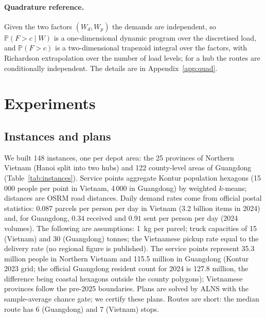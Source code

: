 \documentclass[ijoc,sglanonrev]{informs4}
\renewcommand{\P}{\mathbb{P}}
\begin{document}
\paragraph{Quadrature reference.} Given the two factors $(W_d,W_p)$ the demands are
independent, so $\P(F>c\mid W)$ is a one-dimensional dynamic program over the
discretised load, and $\P(F>c)$ is a two-dimensional trapezoid integral over the
factors, with Richardson extrapolation over the number of load levels; for a hub the
routes are conditionally independent. The details are in Appendix~\ref{app:quad}.

\section{Experiments}
\label{sec:experiments}

\subsection{Instances and plans}
We built 148 instances, one per depot area: the 25 provinces of Northern
Vietnam (Hanoi split into two hubs) and 122 county-level areas of Guangdong
(Table~\ref{tab:instances}). Service points aggregate Kontur population
hexagons (15\,000 people per point in Vietnam, 4\,000 in Guangdong) by
weighted $k$-means; distances are OSRM road distances. Daily demand rates
come from official postal statistics: $0.087$ parcels per person per day in
Vietnam (3.2 billion items in 2024) and, for Guangdong, $0.34$ received and
$0.91$ sent per person per day (2024 volumes). The following are assumptions:
1~kg per parcel; truck capacities of 15 (Vietnam) and 30 (Guangdong) tonnes;
the Vietnamese pickup rate equal to the delivery rate (no regional figure is
published). The service points represent 35.3 million people in Northern
Vietnam and 115.5 million in Guangdong (Kontur 2023 grid; the official
Guangdong resident count for 2024 is 127.8 million, the difference being
coastal hexagons outside the county polygons); Vietnamese provinces follow the
pre-2025 boundaries. Plans are solved by ALNS with the sample-average chance
gate; we certify these plans. Routes are short: the median route has 6
(Guangdong) and 7 (Vietnam) stops.

\begin{table}[t]
\centering\small
\caption{Instances and plans (sample-average gate). Utilisation is the
larger of mean total delivery and mean total pickup over $Q$, per route.}
\label{tab:instances}
\end{table}
\end{document}
